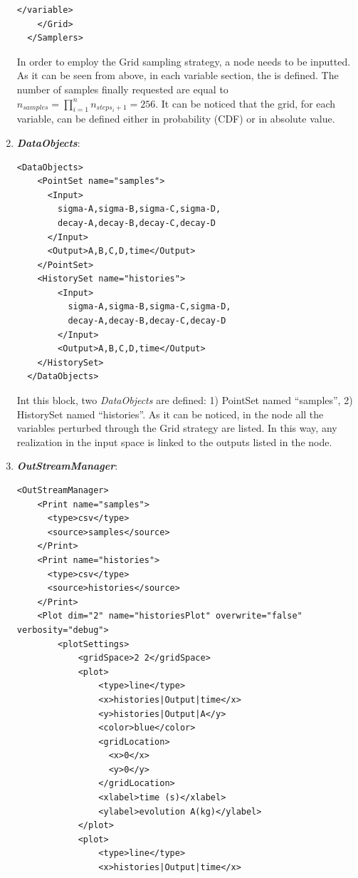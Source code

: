 \begin{enumerate}
\begin{lstlisting}[style=XML,morekeywords={arg,extension,pauseAtEnd,overwrite}]
      </variable>
    </Grid>
  </Samplers>  
\end{lstlisting}
  In order to employ the Grid sampling strategy, a 
   node needs to be inputted. As it can be
  seen from above, in each variable section, the   is defined. 
  The number of samples finally requested are equal to $n_{samples} = \prod_{i=1}^{n} n_{steps_{i}+1} = 256$.
  It can be noticed that the grid, for each variable, can be defined either in probability (CDF) or in absolute value.  
   \item \textbf{\textit{DataObjects}}:
\begin{lstlisting}[style=XML,morekeywords={arg,extension,pauseAtEnd,overwrite}]
  <DataObjects>
    <PointSet name="samples">
      <Input>
        sigma-A,sigma-B,sigma-C,sigma-D,
        decay-A,decay-B,decay-C,decay-D
      </Input>
      <Output>A,B,C,D,time</Output>
    </PointSet>
    <HistorySet name="histories">
        <Input>
          sigma-A,sigma-B,sigma-C,sigma-D,
          decay-A,decay-B,decay-C,decay-D
        </Input>
        <Output>A,B,C,D,time</Output>
    </HistorySet>
  </DataObjects>
\end{lstlisting}
  Int this block, two \textit{DataObjects} are defined: 1) PointSet named 
  ``samples'', 2) HistorySet named ``histories''.
  As it can be noticed, in the  node all the variables 
  perturbed through the Grid strategy are listed. In this way, any
  realization in the input space is linked to the outputs listed in  the 
   node.
   \item \textbf{\textit{OutStreamManager}}:   
\begin{lstlisting}[style=XML,morekeywords={arg,extension,pauseAtEnd,overwrite}]
  <OutStreamManager>
    <Print name="samples">
      <type>csv</type>
      <source>samples</source>
    </Print>
    <Print name="histories">
      <type>csv</type>
      <source>histories</source>
    </Print>
    <Plot dim="2" name="historiesPlot" overwrite="false" verbosity="debug">
        <plotSettings>
            <gridSpace>2 2</gridSpace>
            <plot>
                <type>line</type>
                <x>histories|Output|time</x>
                <y>histories|Output|A</y>
                <color>blue</color>
                <gridLocation>
                  <x>0</x>
                  <y>0</y>
                </gridLocation>
                <xlabel>time (s)</xlabel>
                <ylabel>evolution A(kg)</ylabel>
            </plot>
            <plot>
                <type>line</type>
                <x>histories|Output|time</x>

\end{lstlisting}
\end{enumerate}
